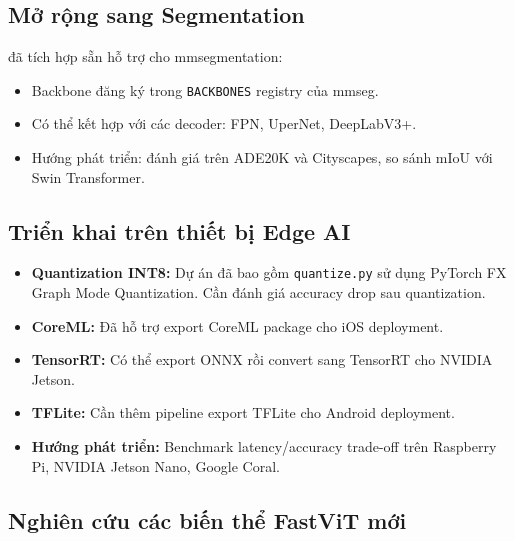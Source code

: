 \subsection{Mở rộng sang Segmentation}
\label{subsec:segmentation}

\fastvit{} đã tích hợp sẵn hỗ trợ cho mmsegmentation:
\begin{itemize}
    \item Backbone đăng ký trong \texttt{BACKBONES} registry của mmseg.
    \item Có thể kết hợp với các decoder: FPN, UperNet, DeepLabV3+.
    \item Hướng phát triển: đánh giá trên ADE20K và Cityscapes, so sánh mIoU với Swin Transformer.
\end{itemize}

\subsection{Triển khai trên thiết bị Edge AI}
\label{subsec:edge_deployment}

\begin{itemize}
    \item \textbf{Quantization INT8:} Dự án đã bao gồm \texttt{quantize.py} sử dụng PyTorch FX Graph Mode Quantization. Cần đánh giá accuracy drop sau quantization.
    \item \textbf{CoreML:} Đã hỗ trợ export CoreML package cho iOS deployment.
    \item \textbf{TensorRT:} Có thể export ONNX rồi convert sang TensorRT cho NVIDIA Jetson.
    \item \textbf{TFLite:} Cần thêm pipeline export TFLite cho Android deployment.
    \item \textbf{Hướng phát triển:} Benchmark latency/accuracy trade-off trên Raspberry Pi, NVIDIA Jetson Nano, Google Coral.
\end{itemize}

\subsection{Nghiên cứu các biến thể FastViT mới}
\label{subsec:new_variants}

